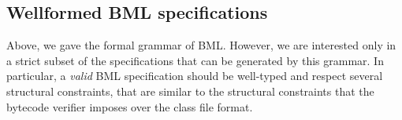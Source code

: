 	



\subsection{Wellformed BML specifications}
Above, we gave the formal grammar of BML.  However, we are interested
only in a strict subset of the specifications that can be generated by
this grammar. In particular, a \emph{valid} BML specification should
be well-typed and respect several structural constraints, that are
similar to the structural constraints that the bytecode verifier
imposes over the class file format.

